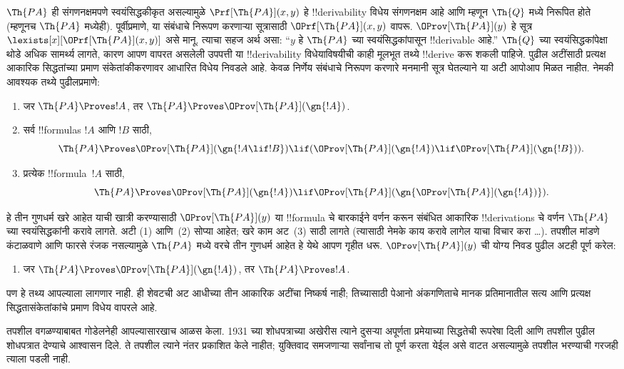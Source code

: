 \documentclass[../../../include/open-logic-section]{subfiles}
\begin{document}
$\Th{PA}$ ही संगणनक्षमपणे
स्वयंसिद्धकीकृत असल्यामुळे
$\Prf[\Th{PA}](x,y)$ हे
!!{derivability} विधेय
संगणनक्षम आहे आणि म्हणून
$\Th{Q}$ मध्ये निरूपित
होते (म्हणूनच
$\Th{PA}$ मध्येही).
पूर्वीप्रमाणे, या संबंधाचे
निरूपण करणाऱ्या सूत्रासाठी
$\OPrf[\Th{PA}](x,y)$
वापरू. $\OProv[\Th{PA}](y)$
हे सूत्र
$\lexists[x][\OPrf[\Th{PA}](x,y)]$
असे मानू. त्याचा सहज
अर्थ असा: “$y$ हे
$\Th{PA}$ च्या स्वयंसिद्धकांपासून
!!{derivable} आहे.”
$\Th{Q}$ च्या स्वयंसिद्धकांपेक्षा
थोडे अधिक सामर्थ्य लागते,
कारण आपण वापरत असलेली
उपपत्ती या !!{derivability}
विधेयाविषयीची काही मूलभूत
तथ्ये !!{derive} करू शकली
पाहिजे. पुढील अटींसाठी प्रत्यक्ष आकारिक सिद्धतांच्या प्रमाण
संकेतांकीकरणावर आधारित विधेय निवडले आहे. केवळ निर्णेय
संबंधाचे निरूपण करणारे मनमानी सूत्र घेतल्याने या अटी
आपोआप मिळत नाहीत. नेमकी आवश्यक तथ्ये
पुढीलप्रमाणे:
\begin{enumerate}
\item[P1.] जर $\Th{PA} \Proves !A$, तर $\Th{PA} \Proves
  \OProv[\Th{PA}](\gn{!A})$.
\item[P2.] सर्व !!{formula}s $!A$ आणि $!B$ साठी,
  \[
  \Th{PA} \Proves \OProv[\Th{PA}](\gn{!A \lif !B}) \lif
  (\OProv[\Th{PA}](\gn{!A}) \lif \OProv[\Th{PA}](\gn{!B})).
  \]
\item[P3.] प्रत्येक !!{formula}~$!A$ साठी,
  \[
  \Th{PA} \Proves \OProv[\Th{PA}](\gn{!A})
  \lif \OProv[\Th{PA}](\gn{\OProv[\Th{PA}](\gn{!A})}).
  \]
\end{enumerate}
हे तीन गुणधर्म खरे आहेत
याची खात्री करण्यासाठी
$\OProv[\Th{PA}](y)$
या !!{formula} चे बारकाईने
वर्णन करून संबंधित आकारिक
!!{derivation}s चे वर्णन
$\Th{PA}$ च्या स्वयंसिद्धकांनी
करावे लागते. अटी (1) आणि~(2)
सोप्या आहेत; खरे काम
अट~(3) साठी लागते
(त्यासाठी नेमके काय
करावे लागेल याचा विचार करा
\dots). तपशील मांडणे
कंटाळवाणे आणि फारसे
रंजक नसल्यामुळे
$\Th{PA}$ मध्ये वरचे
तीन गुणधर्म आहेत हे
येथे आपण गृहीत धरू.
$\OProv[\Th{PA}](y)$
ची योग्य निवड पुढील
अटही पूर्ण करेल:
\begin{enumerate}
\item[P4.] जर $\Th{PA} \Proves \OProv[\Th{PA}](\gn{!A})$, तर
  $\Th{PA} \Proves !A$.
\end{enumerate}
पण हे तथ्य आपल्याला
लागणार नाही. ही शेवटची अट आधीच्या तीन आकारिक अटींचा
निष्कर्ष नाही; तिच्यासाठी पेआनो अंकगणिताचे मानक प्रतिमानातील
सत्य आणि प्रत्यक्ष सिद्धतासंकेतांकांचे प्रमाण विधेय वापरले आहे.

\begin{digress}
तपशील वगळण्याबाबत
गोडेलनेही आपल्यासारखाच
आळस केला. 1931 च्या
शोधपत्राच्या अखेरीस
त्याने दुसऱ्या अपूर्णता
प्रमेयाच्या सिद्धतेची
रूपरेषा दिली आणि
तपशील पुढील शोधपत्रात
देण्याचे आश्वासन दिले.
ते तपशील त्याने
नंतर प्रकाशित केले
नाहीत; युक्तिवाद समजणाऱ्या
सर्वांनाच तो पूर्ण करता
येईल असे वाटत असल्यामुळे
तपशील भरण्याची गरजही
त्याला पडली नाही.
\end{digress}
\end{document}
